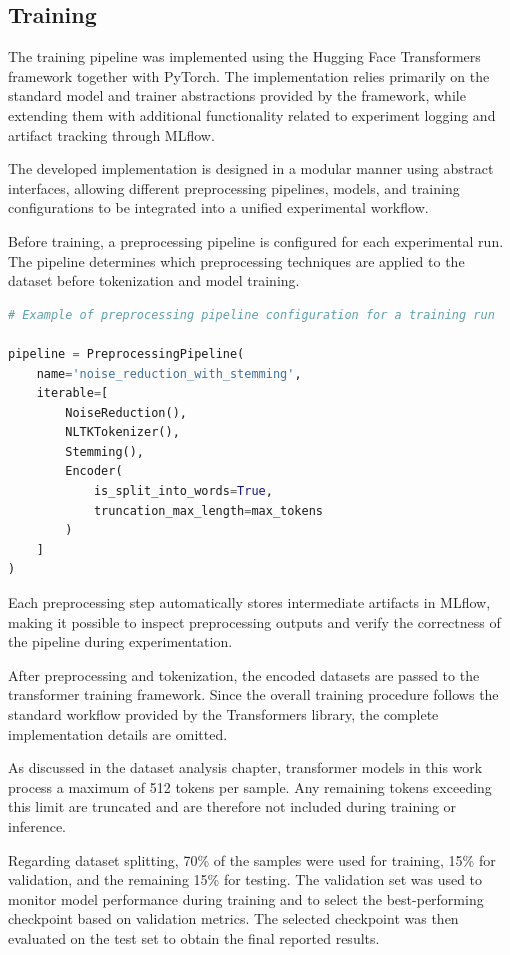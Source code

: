 \subsection{Training}

\begin{markdown}

The training pipeline was implemented using the Hugging Face Transformers framework together with PyTorch. The implementation relies primarily on the standard model and trainer abstractions provided by the framework, while extending them with additional functionality related to experiment logging and artifact tracking through MLflow.

The developed implementation is designed in a modular manner using abstract interfaces, allowing different preprocessing pipelines, models, and training configurations to be integrated into a unified experimental workflow.

Before training, a preprocessing pipeline is configured for each experimental run. The pipeline determines which preprocessing techniques are applied to the dataset before tokenization and model training.

\end{markdown}

\begin{lstlisting}[language=Python, basicstyle=\ttfamily\tiny]
# Example of preprocessing pipeline configuration for a training run

pipeline = PreprocessingPipeline(
    name='noise_reduction_with_stemming',
    iterable=[
        NoiseReduction(),
        NLTKTokenizer(),
        Stemming(),
        Encoder(
            is_split_into_words=True,
            truncation_max_length=max_tokens
        )
    ]
)
\end{lstlisting}

\begin{markdown}

Each preprocessing step automatically stores intermediate artifacts in MLflow, making it possible to inspect preprocessing outputs and verify the correctness of the pipeline during experimentation.

After preprocessing and tokenization, the encoded datasets are passed to the transformer training framework. Since the overall training procedure follows the standard workflow provided by the Transformers library, the complete implementation details are omitted.

As discussed in the dataset analysis chapter, transformer models in this work process a maximum of 512 tokens per sample. Any remaining tokens exceeding this limit are truncated and are therefore not included during training or inference.

Regarding dataset splitting, 70\% of the samples were used for training, 15\% for validation, and the remaining 15\% for testing. The validation set was used to monitor model performance during training and to select the best-performing checkpoint based on validation metrics. The selected checkpoint was then evaluated on the test set to obtain the final reported results.

\end{markdown}

